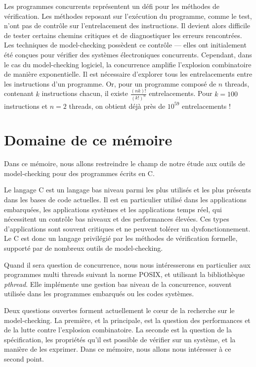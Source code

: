 Les programmes concurrents représentent un défi pour les méthodes de
vérification. Les méthodes reposant sur l'exécution du programme, comme
le test, n'ont pas de contrôle sur l'entrelacement des instructions. Il
devient alors difficile de tester certains chemins critiques et de
diagnostiquer les erreurs rencontrées. Les techniques de model-checking
possèdent ce contrôle --- elles ont initialement été conçues pour vérifier
des systèmes électroniques concurrents. Cependant, dans le cas du
model-checking logiciel, la concurrence amplifie l'explosion
combinatoire de manière exponentielle. Il est nécessaire d'explorer tous
les entrelacements entre les instructions d'un programme. Or, pour un
programme composé de \(n\) threads, contenant \(k\) instructions chacun,
il existe \(\frac{(nk)!}{(k!)^n}\) entrelacements. Pour \(k = 100\)
instructions et \(n = 2\) threads, on obtient déjà près de \(10^{59}\)
entrelacements !

\section{Domaine de ce mémoire}

Dans ce mémoire, nous allons restreindre le champ de notre étude aux
outils de model-checking pour des programmes écrits en C.

Le langage C est un langage bas niveau parmi les plus utilisés et les
plus présents dans les bases de code actuelles. Il est en particulier
utilisé dans les applications embarquées, les applications systèmes et
les applications temps réel, qui nécessitent un contrôle bas niveaux et
des performances élevées. Ces types d'applications sont souvent
critiques et ne peuvent tolérer un dysfonctionnement. Le C est donc un
langage privilégié par les méthodes de vérification formelle, supporté
par de nombreux outils de model-checking.

Quand il sera question de concurrence, nous nous intéresserons en
particulier aux programmes multi threads suivant la norme POSIX, et
utilisant la bibliothèque \emph{pthread}. Elle implémente une gestion
bas niveau de la concurrence, souvent utilisée dans les programmes
embarqués ou les codes systèmes.

Deux questions ouvertes forment actuellement le cœur de la recherche
sur le model-checking. La première, et la principale, est la question
des performances et de la lutte contre l'explosion combinatoire. La
seconde est la question de la spécification, les propriétés qu'il est
possible de vérifier sur un système, et la manière de les exprimer. Dans
ce mémoire, nous allons nous intéresser à ce second point.

